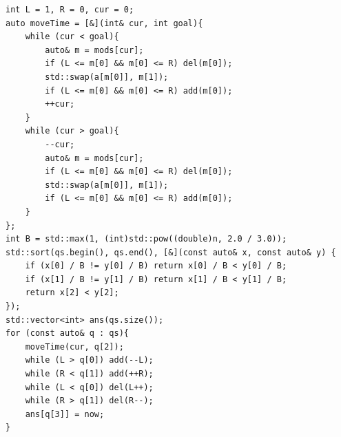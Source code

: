 \begin{lstlisting}
int L = 1, R = 0, cur = 0;
auto moveTime = [&](int& cur, int goal){
    while (cur < goal){
        auto& m = mods[cur];
        if (L <= m[0] && m[0] <= R) del(m[0]);
        std::swap(a[m[0]], m[1]);
        if (L <= m[0] && m[0] <= R) add(m[0]);
        ++cur;
    }
    while (cur > goal){
        --cur;
        auto& m = mods[cur];
        if (L <= m[0] && m[0] <= R) del(m[0]);
        std::swap(a[m[0]], m[1]);
        if (L <= m[0] && m[0] <= R) add(m[0]);
    }
};
int B = std::max(1, (int)std::pow((double)n, 2.0 / 3.0));
std::sort(qs.begin(), qs.end(), [&](const auto& x, const auto& y) {
    if (x[0] / B != y[0] / B) return x[0] / B < y[0] / B;
    if (x[1] / B != y[1] / B) return x[1] / B < y[1] / B;
    return x[2] < y[2];
});
std::vector<int> ans(qs.size());
for (const auto& q : qs){
    moveTime(cur, q[2]);
    while (L > q[0]) add(--L);
    while (R < q[1]) add(++R);
    while (L < q[0]) del(L++);
    while (R > q[1]) del(R--);
    ans[q[3]] = now;
}
\end{lstlisting}
